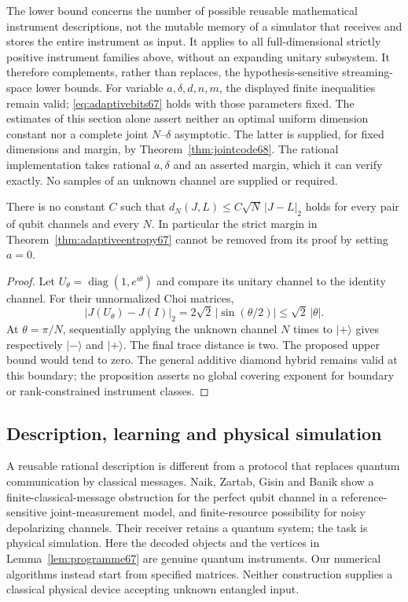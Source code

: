 \begin{remark}\label{rem:adaptivescope67}
The lower bound concerns the number of possible reusable mathematical
instrument descriptions, not the mutable memory of a simulator that
receives and stores the entire instrument as input. It applies to all
full-dimensional strictly positive instrument families above, without
an expanding unitary subsystem. It therefore complements, rather than
replaces, the hypothesis-sensitive streaming-space lower bounds.
For variable $a,\delta,d,n,m$, the displayed finite inequalities remain
valid; \eqref{eq:adaptivebits67} holds with those parameters fixed.
The estimates of this section alone assert neither an optimal uniform
dimension constant nor a complete joint $N$--$\delta$ asymptotic.
The latter is supplied, for fixed dimensions and margin, by
Theorem~\ref{thm:jointcode68}. The rational implementation takes
rational $a,\delta$ and an asserted margin, which it can verify exactly.
No samples of an unknown channel are supplied or required.
\end{remark}

\begin{proposition}\label{prop:boundaryphase67}
There is no constant $C$ such that
$d_N(J,L)\le C\sqrt N\,|J-L|_2$ holds for every pair of qubit channels
and every $N$. In particular the strict margin in
Theorem~\ref{thm:adaptiveentropy67} cannot be removed from its proof by
setting $a=0$.
\end{proposition}
\begin{proof}
Let $U_\theta=\operatorname{diag}(1,e^{i\theta})$ and compare its
unitary channel to the identity channel. For their unnormalized Choi
matrices,
\[
 |J(U_\theta)-J(I)|_2
       =2\sqrt2\,|\sin(\theta/2)|\le\sqrt2\,|\theta|.
\]
At $\theta=\pi/N$, sequentially applying the unknown channel $N$
times to $|+\rangle$ gives respectively $|-\rangle$ and $|+\rangle$.
The final trace distance is two. The proposed upper bound would tend
to zero. The general additive diamond hybrid remains valid at this
boundary; the proposition asserts no global covering exponent for
boundary or rank-constrained instrument classes.
\end{proof}

\subsection{Description, learning and physical simulation}
A reusable rational description is different from a protocol that
replaces quantum communication by classical messages.
Naik, Zartab, Gisin and Banik \cite[Theorems~2 and~5]{NZGB67} show a
finite-classical-message obstruction for the perfect qubit channel in
a reference-sensitive joint-measurement model, and finite-resource
possibility for noisy depolarizing channels. Their receiver retains a
quantum system; the task is physical simulation. Here the decoded
objects and the vertices in Lemma~\ref{lem:programme67} are genuine
quantum instruments. Our numerical algorithms instead start from
specified matrices. Neither construction supplies a classical physical
device accepting unknown entangled input.

